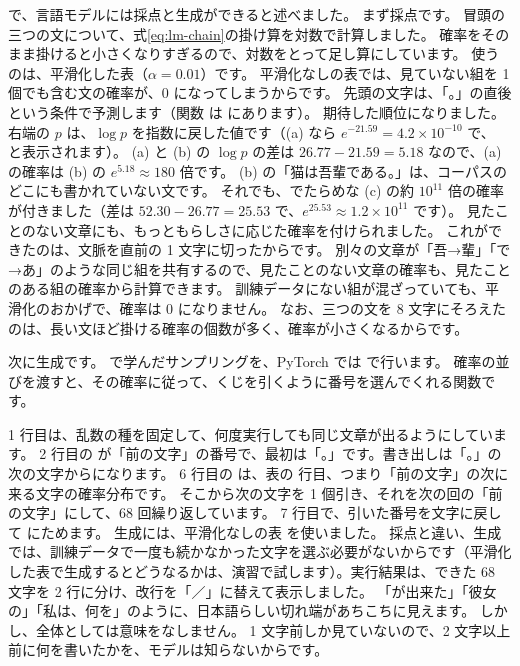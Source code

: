 で、言語モデルには採点と生成ができると述べました。
まず採点です。
冒頭の三つの文について、式\eqref{eq:lm-chain}の掛け算を対数で計算しました。
確率をそのまま掛けると小さくなりすぎるので、対数をとって足し算にしています。
使うのは、平滑化した表（$\alpha=0.01$）です。
平滑化なしの表では、見ていない組を 1 個でも含む文の確率が、0 になってしまうからです。
先頭の文字は、「。」の直後という条件で予測します（関数  は  にあります）。
期待した順位になりました。
右端の $p$ は、$\log p$ を指数に戻した値です（(a) なら $e^{-21.59}=4.2\times10^{-10}$ で、 と表示されます）。
(a) と (b) の $\log p$ の差は $26.77-21.59=5.18$ なので、(a) の確率は (b) の $e^{5.18}\approx180$ 倍です。
(b) の「猫は吾輩である。」は、コーパスのどこにも書かれていない文です。
それでも、でたらめな (c) の約 $10^{11}$ 倍の確率が付きました（差は $52.30-26.77=25.53$ で、$e^{25.53}\approx1.2\times10^{11}$ です）。
見たことのない文章にも、もっともらしさに応じた確率を付けられました。
これができたのは、文脈を直前の 1 文字に切ったからです。
別々の文章が「吾→輩」「で→あ」のような同じ組を共有するので、見たことのない文章の確率も、見たことのある組の確率から計算できます。
訓練データにない組が混ざっていても、平滑化のおかげで、確率は 0 になりません。
なお、三つの文を 8 文字にそろえたのは、長い文ほど掛ける確率の個数が多く、確率が小さくなるからです。

次に生成です。
で学んだサンプリングを、PyTorch では  で行います。
確率の並びを渡すと、その確率に従って、くじを引くように番号を選んでくれる関数です。

\par{} %

1 行目は、乱数の種を固定して、何度実行しても同じ文章が出るようにしています。
2 行目の  が「前の文字」の番号で、最初は「。」です。書き出しは「。」の次の文字からになります。
6 行目の  は、表の  行目、つまり「前の文字」の次に来る文字の確率分布です。
そこから次の文字を 1 個引き、それを次の回の「前の文字」にして、68 回繰り返しています。
7 行目で、引いた番号を文字に戻して  にためます。
生成には、平滑化なしの表  を使いました。
採点と違い、生成では、訓練データで一度も続かなかった文字を選ぶ必要がないからです（平滑化した表で生成するとどうなるかは、演習で試します）。実行結果は、できた 68 文字を 2 行に分け、改行を「／」に替えて表示しました。
「が出来た」「彼女の」「私は、何を」のように、日本語らしい切れ端があちこちに見えます。
しかし、全体としては意味をなしません。
1 文字前しか見ていないので、2 文字以上前に何を書いたかを、モデルは知らないからです。

